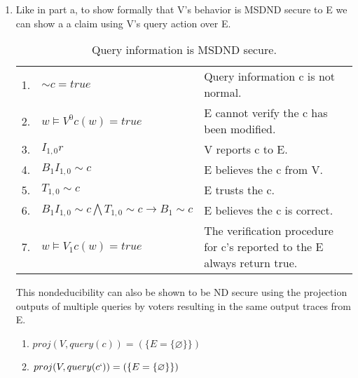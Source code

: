 \documentclass[journal,onecolumn]{IEEEtran}
\begin{document}
\begin{enumerate}
\begin{enumerate}
      \item Like in part a, to show formally that V's behavior is MSDND secure to E we can show a a claim using V's query action over E. 
      
      \begin{table}[H]
        \caption{Query information is MSDND secure.}
        \centering
        \begin{tabular}{lll}
        1.  & ${\sim} c = true$                                                     & Query information c is not normal.                                                       \\
        2.  & $w \vDash V^0 c(w) = true$                                            & E cannot verify the c has been modified.                                 \\
        3.  & $I_{1,0}r$                                                              & V reports c to E.                                                \\
        4.  & $B_1I_{1,0} {\sim} c$                                                   & E believes the c from V.                                     \\
        5.  & $T_{1,0} {\sim} c$                                                      & E trusts the c.                                                          \\
        6.  & $B_1I_{1,0} {\sim} c \bigwedge T_{1,0} {\sim} c \rightarrow B_1 {\sim} c$ & E believes the c is correct.                                             \\
        7. & $w \vDash V_1 c(w) = true$                                             & The verification procedure for c's reported to the E always return true.
        \end{tabular}
      \end{table}
      
      This nondeducibility can also be shown to be ND secure using the projection outputs of multiple queries by voters resulting in the same output traces from E. \\

      \begin{enumerate}
        \item $proj(V, query(c)) = (\{E = \{\varnothing\}\})$       
        \item $proj(V, query(c`)) = (\{E = \{\varnothing\}\})$
      \end{enumerate}


\end{enumerate}
\end{enumerate}
\end{document}
